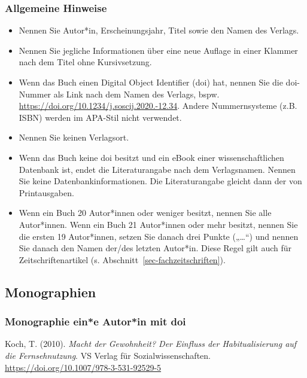 \documentclass[
  letterpaper,
  DIV=11]{scrreprt}
\begin{document}
\subsubsection{\texorpdfstring{\textbf{Allgemeine
Hinweise}}{Allgemeine Hinweise}}\label{allgemeine-hinweise-2}

\begin{itemize}
\item
  Nennen Sie Autor*in, Erscheinungsjahr, Titel sowie den Namen des
  Verlags.
\item
  Nennen Sie jegliche Informationen über eine neue Auflage in einer
  Klammer nach dem Titel ohne Kursivsetzung.
\item
  Wenn das Buch einen Digital Object Identifier (doi) hat, nennen Sie
  die doi-Nummer als Link nach dem Namen des Verlags, bspw.
  \url{https://doi.org/10.1234/j.soscij.2020.-12.34}. Andere
  Nummernsysteme (z.B. ISBN) werden im APA-Stil nicht verwendet.
\item
  Nennen Sie keinen Verlagsort.
\item
  Wenn das Buch keine doi besitzt und ein eBook einer wissenschaftlichen
  Datenbank ist, endet die Literaturangabe nach dem Verlagsnamen. Nennen
  Sie keine Datenbankinformationen. Die Literaturangabe gleicht dann der
  von Printausgaben.
\item
  Wenn ein Buch 20 Autor*innen oder weniger besitzt, nennen Sie alle
  Autor*innen. Wenn ein Buch 21 Autor*innen oder mehr besitzt, nennen
  Sie die ersten 19 Autor*innen, setzen Sie danach drei Punkte
  („\ldots``) und nennen Sie danach den Namen der/des letzten Autor*in.
  Diese Regel gilt auch für Zeitschriftenartikel (s.
  Abschnitt~\ref{sec-fachzeitschriften}).
\end{itemize}

\subsection{Monographien}\label{monographien}

\subsubsection{Monographie \textbar{} ein*e Autor*in \textbar{} mit
doi}\label{monographie-eine-autorin-mit-doi}

Koch, T. (2010). \emph{Macht der Gewohnheit? Der Einfluss der
Habitualisierung auf die Fernsehnutzung}. VS Verlag für
Sozialwissenschaften. \url{https://doi.org/10.1007/978-3-531-92529-5}
\end{document}

